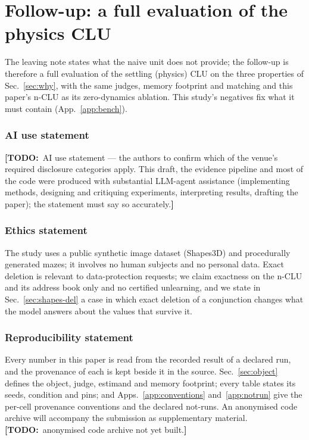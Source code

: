 \documentclass{article} %
\newcommand{\TODO}[1]{{\color{orange}\textbf{[TODO:}~#1\textbf{]}}}
\begin{document}
\section{Follow-up: a full evaluation of the physics CLU}
\label{sec:followup}

The leaving note states what the naive unit does not provide; the follow-up is therefore a full evaluation of the settling (physics) CLU on the three properties of Sec.~\ref{sec:why}, with the same judges, memory footprint and matching and this paper's n-CLU as its zero-dynamics ablation. This study's negatives fix what it must contain (App.~\ref{app:bench}).

\subsubsection*{AI use statement}
\TODO{AI use statement --- the authors to confirm which of the venue's required disclosure categories
apply. This draft, the evidence pipeline and most of the code were produced with substantial LLM-agent
assistance (implementing methods, designing and critiquing experiments, interpreting results,
drafting the paper); the statement must say so accurately.}

\subsubsection*{Ethics statement}
The study uses a public synthetic image dataset (Shapes3D) and procedurally generated mazes; it
involves no human subjects and no personal data. Exact deletion is relevant to data-protection
requests; we claim exactness on the n-CLU and its address book only and no certified unlearning, and
we state in Sec.~\ref{sec:shapes-del} a case in which exact deletion of a conjunction changes what the
model answers about the values that survive it.

\subsubsection*{Reproducibility statement}
Every number in this paper is read from the recorded result of a declared run,
and the provenance of each is kept beside it in the source. Sec.~\ref{sec:object} defines the
object, judge, estimand and memory footprint; every table states its seeds, condition and pins; and
Apps.~\ref{app:conventions} and~\ref{app:notrun} give the per-cell provenance conventions and
the declared not-runs. An anonymised code archive will accompany the submission as
supplementary material. \TODO{anonymised code archive not yet built.}
\end{document}

